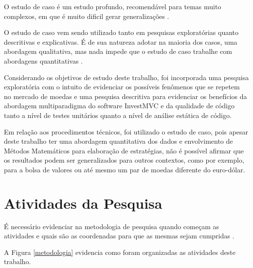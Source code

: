 O estudo de caso é um estudo profundo, recomendável para temas muito complexos, em que é muito dificil gerar generalizações \cite[pág.~33]{fonseca2002}.

O estudo de caso vem sendo utilizado tanto em pesquisas exploratórias quanto descritivas e explicativas. É de sua natureza adotar na maioria dos casos, uma abordagem qualitativa, mas nada impede que o estudo de caso trabalhe com abordagens quantitativas \cite[pág.~22]{yin}.

Considerando os objetivos de estudo deste trabalho, foi incorporada uma pesquisa exploratória com o intuito de evidenciar os possíveis fenômenos que se repetem no mercado de moedas e uma pesquisa descritiva para evidenciar os benefícios da abordagem multiparadigma do software InvestMVC e da qualidade de código tanto a nível de testes unitários quanto a nível de análise estática de código.

Em relação aos procedimentos técnicos, foi utilizado o estudo de caso, pois apesar deste trabalho ter uma abordagem quantitativa dos dados e envolvimento de Métodos Matemáticos para elaboração de estratégias, não é possível afirmar que os resultados podem ser generalizados para outros contextos, como por exemplo, para a bolsa de valores ou até mesmo um par de moedas diferente do euro-dólar.

\section{Atividades da Pesquisa}

É necessário evidenciar na metodologia de pesquisa quando começam as atividades e quais são as coordenadas para que as mesmas sejam cumpridas \cite{forcon2014}.

A Figura \ref{metodologia} evidencia como foram organizadas as atividades deste trabalho.

